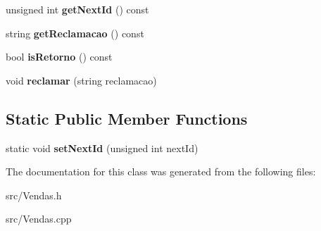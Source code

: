 \begin{DoxyCompactItemize}
\item 
\hypertarget{class_vendas_a3a23da44b124f50b3e73e5f568046695}{unsigned int {\bfseries get\+Next\+Id} () const }\label{class_vendas_a3a23da44b124f50b3e73e5f568046695}

\item 
\hypertarget{class_vendas_a13064baa0f6c550cd433946c96a6d0aa}{string {\bfseries get\+Reclamacao} () const }\label{class_vendas_a13064baa0f6c550cd433946c96a6d0aa}

\item 
\hypertarget{class_vendas_a1f5542e8c66cbe9114a7968ffd10d5e2}{bool {\bfseries is\+Retorno} () const }\label{class_vendas_a1f5542e8c66cbe9114a7968ffd10d5e2}

\item 
\hypertarget{class_vendas_ac5bf776bb0b33835e5a3d8728db851fc}{void {\bfseries reclamar} (string reclamacao)}\label{class_vendas_ac5bf776bb0b33835e5a3d8728db851fc}

\end{DoxyCompactItemize}
\subsection*{Static Public Member Functions}
\begin{DoxyCompactItemize}
\item 
\hypertarget{class_vendas_a6b007d0524e51c0a48796a6d9fb9948e}{static void {\bfseries set\+Next\+Id} (unsigned int next\+Id)}\label{class_vendas_a6b007d0524e51c0a48796a6d9fb9948e}

\end{DoxyCompactItemize}


The documentation for this class was generated from the following files\+:\begin{DoxyCompactItemize}
\item 
src/Vendas.\+h\item 
src/Vendas.\+cpp\end{DoxyCompactItemize}
